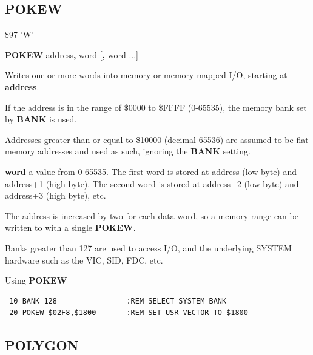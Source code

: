 \subsection{POKEW}
\begin{description}[leftmargin=2cm,style=nextline]
\item [Token:] \$97 'W'
\item [Format:] {\bf POKEW} address{\bf,} word [{\bf,} word ...]
\item [Usage:]  Writes one or more words into memory
                or memory mapped I/O, starting at
                {\bf address}.

                If the address is in the range of \$0000 to \$FFFF (0-65535), the
                memory bank set by {\bf BANK} is used.

                Addresses greater than or equal to \$10000 (decimal 65536) are assumed to be flat memory
                addresses and used as such, ignoring the {\bf BANK} setting.

                {\bf word} a value from 0-65535.
                The first word is stored at address (low byte)
                and address+1 (high byte). The second word is stored at
                address+2 (low byte) and address+3 (high byte), etc.

\item [Remarks:] The address is increased by two for each data word,
                 so a memory range can be written to with a single {\bf POKEW}.

                Banks greater than 127 are used to access I/O, and the underlying SYSTEM hardware such as the
                VIC, SID, FDC, etc.
\item [Example:] Using {\bf POKEW}

\begin{tcolorbox}[colback=black,coltext=white]
\verbatimfont{\codefont}
\begin{verbatim}
 10 BANK 128                :REM SELECT SYSTEM BANK
 20 POKEW $02F8,$1800       :REM SET USR VECTOR TO $1800
\end{verbatim}
\end{tcolorbox}
\end{description}


\newpage
\subsection{POLYGON}

